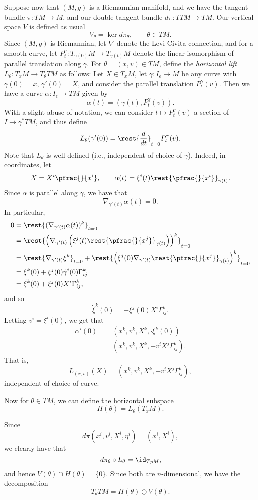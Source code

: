 Suppose now that $(M,g)$ is a Riemannian manifold, and we have the tangent bundle $\pi:TM\to M$, and our double tangent bundle $d\pi:TTM\to TM$.  Our vertical space $V$ is defined as usual
$$V_\theta=\ker{d\pi_\theta},\qquad \theta\in TM.$$
Since $(M,g)$ is Riemannian, let $\nabla$ denote the Levi-Civita connection, and for a smooth curve, let $P^\gamma_t:T_{\gamma(0)}M\to T_{\gamma(t)}M$ denote the linear isomorphism of parallel translation along $\gamma$.  For $\theta=(x,v)\in TM$, define the \textit{horizontal lift} $L_\theta:T_xM\to T_\theta TM$ as follows:  Let $X\in T_xM$, let $\gamma:I_\epsilon\to M$ be any curve with $\gamma(0)=x$, $\gamma'(0)=X$, and consider the parallel translation $P_t^\gamma(v)$.  Then we have a curve $\alpha:I_\epsilon\to TM$ given by
$$\alpha(t)=(\gamma(t),P_t^\gamma(v)).$$
With a slight abuse of notation, we can consider $t\mapsto P_t^\gamma(v)$ a section of $I\to\gamma^*TM$, and thus define
$$L_\theta(\gamma'(0))=\rest{\frac{d}{dt}}_{t=0}P_t^\gamma(v).$$
Note that $L_\theta$ is well-defined (i.e., independent of choice of $\gamma$).  Indeed, in coordinates, let
$$X=X^i\pfrac{}{x^i},\qquad \alpha(t)=\xi^i(t)\rest{\pfrac{}{x^i}}_{\gamma(t)}.$$
Since $\alpha$ is parallel along $\gamma$, we have that
$$\nabla_{\gamma'(t)}\alpha(t)=0.$$
In particular,
\begin{align*}
0&=\rest{(\nabla_{\gamma'(t)}\alpha(t))^k}_{t=0}\\
&=\rest{\left(\nabla_{\gamma'(t)}\left(\xi^j(t)\rest{\pfrac{}{x^j}}_{\gamma(t)}\right)\right)^k}_{t=0}\\
&=\rest{\nabla_{\gamma'(t)}\xi^k}_{t=0}+\rest{\left(\xi^j(0)\nabla_{\gamma'(t)}\rest{\pfrac{}{x^j}}_{\gamma(t)}\right)^k}_{t=0}\\
&=\dot{\xi}^k(0)+\xi^j(0)\dot{\gamma}^i(0)\Gamma_{ij}^k\\
&=\dot{\xi}^k(0)+\xi^j(0)X^i\Gamma_{ij}^k,
\end{align*}
and so
$$\dot{\xi}^k(0)=-\xi^j(0)X^i\Gamma_{ij}^k.$$
Letting $v^i=\xi^i(0)$, we get that
\begin{align*}
\alpha'(0)&=(x^k, v^k, X^k, \cdot{\xi}^k(0))\\
&=(x^k, v^k, X^k, -v^iX^j\Gamma_{ij}^k).
\end{align*}
That is,
$$L_{(x,v)}(X)=(x^k,v^k,X^k,-v^iX^j\Gamma_{ij}^k),$$
independent of choice of curve.

Now for $\theta\in TM$, we can define the horizontal subspace
$$H(\theta)=L_\theta(T_xM).$$

Since
$$d\pi(x^i,v^i,X^i,\eta^i)=(x^i, X^i),$$
we clearly have that
$$d\pi_\theta\circ L_\theta=\id_{TpM},$$
and hence $V(\theta)\cap H(\theta)=\{0\}$.  Since both are $n$-dimensional, we have the decomposition
$$T_\theta TM=H(\theta)\oplus V(\theta).$$

